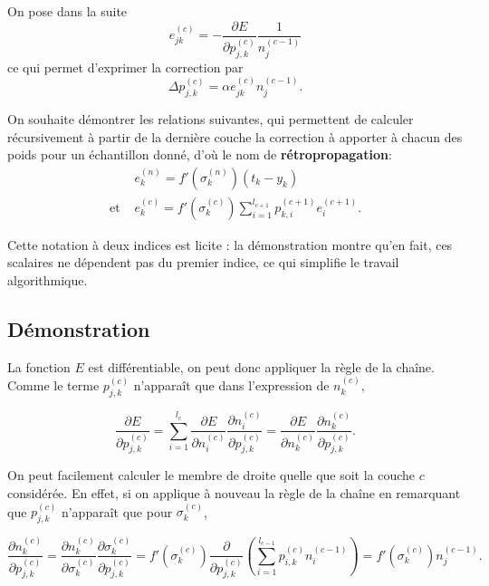 \documentclass[12pt]{article}
\newcommand{\lc}[1]{l_{#1}}
\newcommand{\neurone}[2]{n_{ #1 }^{ (#2) }}
\newcommand{\poids}[3]{p_{#1,#2}^{ (#3) }}
\newcommand{\nps}[2]{\sigma_{ #1 }^{ (#2) }} %
\newcommand{\err}[3]{e_{ #1 #2 }^{ (#3) }}
\newcommand{\er}[2]{e_{ #1}^{ (#2) }} %
\begin{document}
		On pose dans la suite
		\begin{equation}
			\err{j}{k}{c} = - \frac{ \partial E }{ \partial \poids{j}{k}{c} } \frac{1}{ \neurone{j}{c-1} }
		\end{equation}
		ce qui permet d'exprimer la correction par
		\begin{equation}
			\Delta \poids{j}{k}{c} =  \alpha \err{j}{k}{c} \neurone{j}{c-1}.
		\end{equation}

		On souhaite démontrer les relations suivantes, qui permettent de calculer récursivement à partir de la dernière couche la correction à apporter à chacun des poids pour un échantillon donné, d'où le nom de \textbf{rétropropagation}:
		\begin{align}
			&\boxed{ \er{k}{n} = f'(\nps{k}{n}) (t_k - y_k) } \\
			\text{et } &\boxed{ \er{k}{c} = f'(\nps{k}{c}) \sum_{i=1}^{\lc{c+1}} \poids{k}{i}{c+1} \er{i}{c+1} }.
		\end{align}

		Cette notation à deux indices est licite : la démonstration montre qu'en fait, ces scalaires ne dépendent pas du premier indice, ce qui simplifie le travail algorithmique.

	\subsection{Démonstration}
	
		La fonction $E$ est différentiable, on peut donc appliquer la règle de la chaîne. Comme le terme $\poids{j}{k}{c}$ n'apparaît que dans l'expression de $\neurone{k}{c}$,
		
		\begin{equation}\label{depart}
			\frac{ \partial E }{ \partial \poids{j}{k}{c} } = 
			\sum_{i=1}^{\lc{c}} \frac{ \partial E }{ \partial \neurone{i}{c} } \frac{ \partial \neurone{i}{c} }{ \partial \poids{j}{k}{c} } 
			= \frac{ \partial E }{ \partial \neurone{k}{c} } \frac{ \partial \neurone{k}{c} }{ \partial \poids{j}{k}{c} }.
		\end{equation}
		
		On peut facilement calculer le membre de droite quelle que soit la couche $c$ considérée. En effet, si on applique à nouveau la règle de la chaîne en remarquant que $\poids{j}{k}{c}$ n'apparaît que pour $\nps{k}{c}$,
		
		\begin{equation}\label{terme_a_droite}
			\frac{ \partial \neurone{k}{c} }{ \partial \poids{j}{k}{c} }
			= \frac{ \partial \neurone{k}{c} }{ \partial \nps{k}{c} } \frac{ \partial \nps{k}{c} }{ \partial \poids{j}{k}{c} }
			= f'(\nps{k}{c}) \frac{ \partial }{ \partial \poids{j}{k}{c} } \left( \sum_{i=1}^{\lc{c-1}} \poids{i}{k}{c} \neurone{i}{c-1} \right)
			= f'(\nps{k}{c}) \neurone{j}{c-1}.
		\end{equation}
\end{document}
